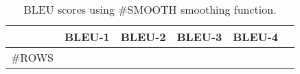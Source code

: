 \begin{table}[!t]
\centering
\begin{tabular}{@{}l|l|l|l|l|l@{}}
\textbf{} & \textbf{BLEU-1} & \textbf{BLEU-2} & \textbf{BLEU-3} & \textbf{BLEU-4} \\ \midrule
#ROWS
\bottomrule
\end{tabular}
\caption{BLEU scores using #SMOOTH smoothing function.}
\label{tab::bleu-#SMOOTH}
\end{table}
